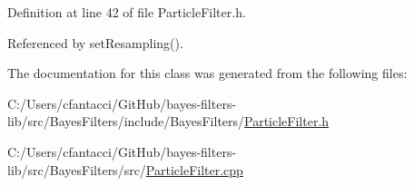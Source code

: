 Definition at line 42 of file Particle\+Filter.\+h.



Referenced by set\+Resampling().



The documentation for this class was generated from the following files\+:\begin{DoxyCompactItemize}
\item 
C\+:/\+Users/cfantacci/\+Git\+Hub/bayes-\/filters-\/lib/src/\+Bayes\+Filters/include/\+Bayes\+Filters/\mbox{\hyperlink{ParticleFilter_8h}{Particle\+Filter.\+h}}\item 
C\+:/\+Users/cfantacci/\+Git\+Hub/bayes-\/filters-\/lib/src/\+Bayes\+Filters/src/\mbox{\hyperlink{ParticleFilter_8cpp}{Particle\+Filter.\+cpp}}\end{DoxyCompactItemize}
